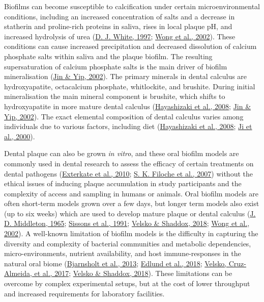 \documentclass[
  letterpaper,
]{book}
\begin{document}
Biofilms can become susceptible to calcification under certain
microenvironmental conditions, including an increased concentration of
salts and a decrease in statherin and proline-rich proteins in saliva,
rises in local plaque pH, and increased hydrolysis of urea
(\protect\hyperlink{ref-whiteDentalCalculus1997}{D. J. White, 1997};
\protect\hyperlink{ref-wongCalciumPhosphate2002}{Wong et al., 2002}).
These conditions can cause increased precipitation and decreased
dissolution of calcium phosphate salts within saliva and the plaque
biofilm. The resulting supersaturation of calcium phosphate salts is the
main driver of biofilm mineralisation
(\protect\hyperlink{ref-jinSupragingivalCalculus2002}{Jin \& Yip,
2002}). The primary minerals in dental calculus are hydroxyapatite,
octacalcium phosphate, whitlockite, and brushite. During initial
mineralisation the main mineral component is brushite, which shifts to
hydroxyapatite in more mature dental calculus
(\protect\hyperlink{ref-hayashizakiSiteSpecific2008}{Hayashizaki et al.,
2008}; \protect\hyperlink{ref-jinSupragingivalCalculus2002}{Jin \& Yip,
2002}). The exact elemental composition of dental calculus varies among
individuals due to various factors, including diet
(\protect\hyperlink{ref-hayashizakiSiteSpecific2008}{Hayashizaki et al.,
2008}; \protect\hyperlink{ref-jiFluorideMagnesium2000}{Ji et al.,
2000}).

Dental plaque can also be grown \emph{in vitro}, and these oral biofilm
models are commonly used in dental research to assess the efficacy of
certain treatments on dental pathogens
(\protect\hyperlink{ref-extercateAAA2010}{Exterkate et al., 2010};
\protect\hyperlink{ref-filochePlaqueMicrocosm2007}{S. K. Filoche et al.,
2007}) without the ethical issues of inducing plaque accumulation in
study participants and the complexity of access and sampling in humans
or animals. Oral biofilm models are often short-term models grown over a
few days, but longer term models also exist (up to six weeks) which are
used to develop mature plaque or dental calculus
(\protect\hyperlink{ref-middletonVitroCalculus1965}{J. D. Middleton,
1965}; \protect\hyperlink{ref-sissonsMultistationPlaque1991}{Sissons et
al., 1991};
\protect\hyperlink{ref-velskoConsistentReproducible2018}{Velsko \&
Shaddox, 2018}; \protect\hyperlink{ref-wongCalciumPhosphate2002}{Wong et
al., 2002}). A well-known limitation of biofilm models is the difficulty
in capturing the diversity and complexity of bacterial communities and
metabolic dependencies, micro-environments, nutrient availability, and
host immune-responses in the natural oral biome
(\protect\hyperlink{ref-bjarnsholtVivoBiofilm2013}{Bjarnsholt et al.,
2013}; \protect\hyperlink{ref-edlundUncoveringComplex2018}{Edlund et
al., 2018}; \protect\hyperlink{ref-velskoCytokineResponse2017}{Velsko,
Cruz-Almeida, et al., 2017};
\protect\hyperlink{ref-velskoConsistentReproducible2018}{Velsko \&
Shaddox, 2018}). These limitations can be overcome by complex
experimental setups, but at the cost of lower throughput and increased
requirements for laboratory facilities.
\end{document}
